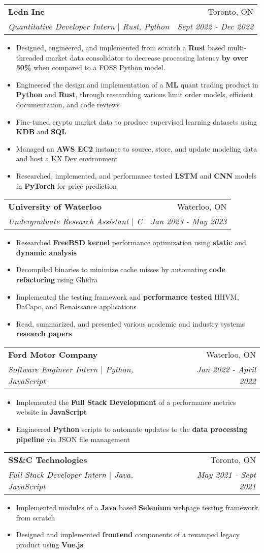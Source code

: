 \documentclass[letterpaper,11pt]{article}
\makeatletter
\newcommand{\resumeItem}[1]{
  \item\small{
    {#1 \vspace{-2pt}}
  }
}
\newcommand{\resumeSubheading}[4]{
  \vspace{-2pt}\item
    \begin{tabular*}{0.97\textwidth}[t]{l@{\extracolsep{\fill}}r}
      \textbf{#1} & #2 \\
      \textit{\small#3} & \textit{\small #4} \\
    \end{tabular*}\vspace{-7pt}
}
\newcommand{\resumeItemListStart}{\begin{itemize}}
\newcommand{\resumeItemListEnd}{\end{itemize}\vspace{-5pt}}
\makeatother
\begin{document}
  \resumeSubheading
      {Ledn Inc}{Toronto, ON}
      {Quantitative Developer Intern $|$ Rust, Python}{Sept 2022 - Dec 2022}
      \resumeItemListStart
      \resumeItem{ Designed, engineered, and implemented from scratch a \textbf{Rust} based multi-threaded market data consolidator to decrease processing latency \textbf{by over 50\%} when compared to a FOSS Python model.}
      \resumeItem{ Engineered the design and implementation of a\textbf{ ML} quant trading product in \textbf{Python} and \textbf{Rust}, through researching various limit order models, efficient documentation, and code reviews }
      \resumeItem{ Fine-tuned crypto market data to produce supervised learning datasets using \textbf{KDB} and \textbf{SQL}}
      \resumeItem{ Managed an \textbf{AWS EC2} instance to source, store, and update modeling data and host a KX Dev environment}
      \resumeItem{ Researched, implemented, and performance tested \textbf{LSTM} and \textbf{CNN} models in \textbf{PyTorch} for price prediction}
        \resumeItemListEnd

    \resumeSubheading
      {University of Waterloo}{Waterloo, ON}
      {Undergraduate Research Assistant $|$ C}{Jan 2023 - May 2023}
      \resumeItemListStart
      \resumeItem{Researched \textbf{FreeBSD kernel} performance optimization using \textbf{static} and \textbf{dynamic analysis }}
      \resumeItem{Decompiled binaries to minimize cache misses by automating \textbf{code refactoring }using Ghidra}
      \resumeItem{Implemented the testing framework and \textbf{performance tested} HHVM, DaCapo, and Renaissance applications}
      \resumeItem{Read, summarized, and presented various academic and industry systems \textbf{research papers}}
      \resumeItemListEnd
      

      \resumeSubheading
      {Ford Motor Company}{Waterloo, ON}
      {Software Engineer Intern $|$ Python, JavaScript}{Jan 2022 - April 2022}
      \resumeItemListStart
      \resumeItem{Implemented the \textbf{Full Stack Development} of a performance metrics website in \textbf{JavaScript}}
      \resumeItem{Engineered \textbf{Python} scripts to automate updates to the \textbf{data processing pipeline} via JSON file management}

      \resumeItemListEnd

      \resumeSubheading
      {SS\&C Technologies}{Toronto, ON}
      {Full Stack Developer Intern $|$ Java, JavaScript} {May 2021 - Sept 2021}
      \resumeItemListStart
      \resumeItem{Implemented modules of a \textbf{Java} based \textbf{Selenium} webpage testing framework from scratch }
      \resumeItem{Designed and implemented \textbf{frontend }components of a revamped legacy product using \textbf{Vue.js }}
      \resumeItemListEnd
\end{document}

